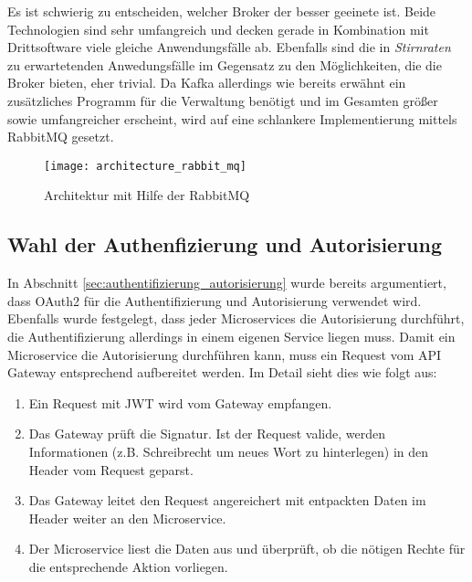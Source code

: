 {Es ist schwierig zu entscheiden, welcher Broker der besser geeinete ist. Beide Technologien sind sehr umfangreich und decken gerade in Kombination mit Drittsoftware viele gleiche Anwendungsfälle ab. Ebenfalls sind die in \textit{Stirnraten} zu erwartetenden Anwedungsfälle im Gegensatz zu den Möglichkeiten, die die Broker bieten, eher trivial. Da Kafka allerdings wie bereits erwähnt ein zusätzliches Programm für die Verwaltung benötigt und im Gesamten größer sowie umfangreicher erscheint, wird auf eine schlankere Implementierung mittels RabbitMQ gesetzt.\\

\begin{figure}[ht]
	\centering
	\texttt{[image: architecture\_rabbit\_mq]}
	\caption[Architektur mit Hilfe von RabbitMQ] {Architektur mit Hilfe der RabbitMQ}
	\label{fig:architecture_rabbit_mq}
\end{figure}

\subsection{Wahl der Authenfizierung und Autorisierung} \label{sec:concept_authentifizierung_autorisierung}

In Abschnitt \ref{sec:authentifizierung_autorisierung} wurde bereits argumentiert, dass OAuth2 für die Authentifizierung und Autorisierung verwendet wird. Ebenfalls wurde festgelegt, dass jeder Microservices die Autorisierung durchführt, die Authentifizierung allerdings in einem eigenen Service liegen muss. Damit ein Microservice die Autorisierung durchführen kann, muss ein Request vom API Gateway entsprechend aufbereitet werden. Im Detail sieht dies wie folgt aus\cite{richardson2019mic_pattern}:\\
\begin{enumerate}
	\item  Ein Request mit JWT wird vom Gateway empfangen.
	\item Das Gateway prüft die Signatur. Ist der Request valide, werden Informationen (z.B. Schreibrecht um neues Wort zu hinterlegen) in den Header vom Request geparst. 
	\item Das Gateway leitet den Request angereichert mit entpackten Daten im Header weiter an den Microservice.
	\item Der Microservice liest die Daten aus und überprüft, ob die nötigen Rechte für die entsprechende Aktion vorliegen.
\end{enumerate}

}
